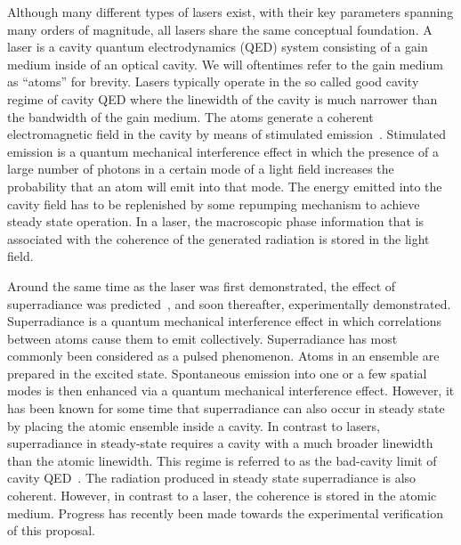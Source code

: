 \documentclass[aps,
twocolumn,
superscriptaddress,groupedaddress]{revtex4}
\begin{document}
Although many different types of lasers exist, with their key
parameters spanning many orders of magnitude, all lasers share the
same conceptual foundation.  A laser is a cavity quantum
electrodynamics (QED) system consisting of a gain medium inside of an
optical cavity.  We will oftentimes refer to the gain medium as
``atoms'' for brevity.  Lasers typically operate in the so called good
cavity regime of cavity QED where the linewidth of the cavity is much
narrower than the bandwidth of the gain medium.  The atoms generate a
coherent electromagnetic field in the cavity by means of stimulated
emission~\cite{PhysRev.112.1940}. Stimulated emission is a quantum
mechanical interference effect in which the presence of a large number
of photons in a certain mode of a light field increases the
probability that an atom will emit into that mode. The energy emitted
into the cavity field has to be replenished by some repumping
mechanism to achieve steady state operation. In a laser, the
macroscopic phase information that is associated with the coherence of
the generated radiation is stored in the light field.

Around the same time as the laser was first demonstrated, the effect
of superradiance was predicted~\cite{PhysRev.93.99}, and soon
thereafter, experimentally demonstrated.  Superradiance is a quantum
mechanical interference effect in which correlations between atoms
cause them to emit collectively.  Superradiance has most commonly been
considered as a pulsed phenomenon.  Atoms in an ensemble are prepared
in the excited state.  Spontaneous emission into one or a few spatial
modes is then enhanced via a quantum mechanical interference effect.
However, it has been known for some time that superradiance can also
occur in steady state~\cite{PhysRevLett.102.163601,
  PhysRevA.81.033847, PhysRevA.81.063827,PhysRevLett.89.253003} by
placing the atomic ensemble inside a cavity.  In contrast to lasers,
superradiance in steady-state requires a cavity with a much broader
linewidth than the atomic linewidth.  This regime is referred to as
the bad-cavity limit of cavity QED~\cite{PhysRevA.51.809,
  PhysRevLett.72.3815, ChenDeliciousLaser, HakenLaser,
  HakenLaserBook}.  The radiation produced in steady state
superradiance is also coherent.  However, in contrast to a laser, the
coherence is stored in the atomic medium.  Progress has recently been
made towards the experimental verification~\cite{ThompsonPaper} of
this proposal.
\end{document}
